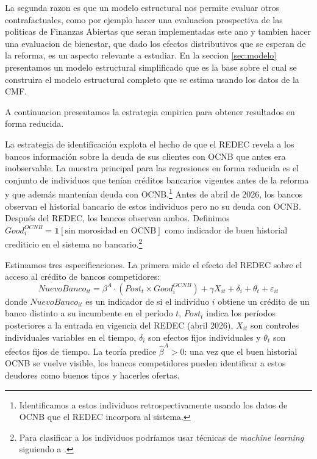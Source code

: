 \documentclass[11pt]{article}
\theoremstyle{plain}
\theoremstyle{plain}
\begin{document}
La segunda razon es que un modelo estructural nos permite evaluar otros contrafactuales, como por ejemplo hacer una evaluacion prospectiva de las politicas de Finanzas Abiertas que seran implementadas este ano y tambien hacer una evaluacion de bienestar, que dado los efectos distributivos que se esperan de la reforma, es un aspecto relevante a estudiar. En la seccion \ref{sec:modelo} presentamos un modelo estructural simplificado que es la base sobre el cual se construira el modelo estructural completo que se estima usando los datos de la CMF.

A continuacion presentamos la estrategia empirica para obtener resultados en forma reducida.

La estrategia de identificación explota el hecho de que el REDEC revela a los bancos información sobre la deuda de sus clientes con OCNB que antes era inobservable. La muestra principal para las regresiones en forma reducida es el conjunto de individuos que tenían créditos bancarios vigentes antes de la reforma y que además mantenían deuda con OCNB.\footnote{Identificamos a estos individuos retrospectivamente usando los datos de OCNB que el REDEC incorpora al sistema.} Antes de abril de 2026, los bancos observan el historial bancario de estos individuos pero no su deuda con OCNB. Después del REDEC, los bancos observan ambos. Definimos $Good_i^{OCNB} = \mathbf{1}[\text{sin morosidad en OCNB}]$ como indicador de buen historial crediticio en el sistema no bancario.\footnote{Para clasificar a los individuos podríamos usar técnicas de \textit{machine learning} siguiendo a \textcite{liberman_equilibrium_2018}.}

Estimamos tres especificaciones. La primera mide el efecto del REDEC sobre el acceso al crédito de bancos competidores:
\begin{equation}
    NuevoBanco_{it} = \beta^A \cdot (Post_t \times Good_i^{OCNB}) + \gamma X_{it} + \delta_i + \theta_t + \varepsilon_{it}
    \label{eqn:access}
\end{equation}
donde $NuevoBanco_{it}$ es un indicador de si el individuo $i$ obtiene un crédito de un banco distinto a su incumbente en el período $t$, $Post_t$ indica los períodos posteriores a la entrada en vigencia del REDEC (abril 2026), $X_{it}$ son controles individuales variables en el tiempo, $\delta_i$ son efectos fijos individuales y $\theta_t$ son efectos fijos de tiempo. La teoría predice $\hat{\beta}^A > 0$: una vez que el buen historial OCNB se vuelve visible, los bancos competidores pueden identificar a estos deudores como buenos tipos y hacerles ofertas.
\end{document}
